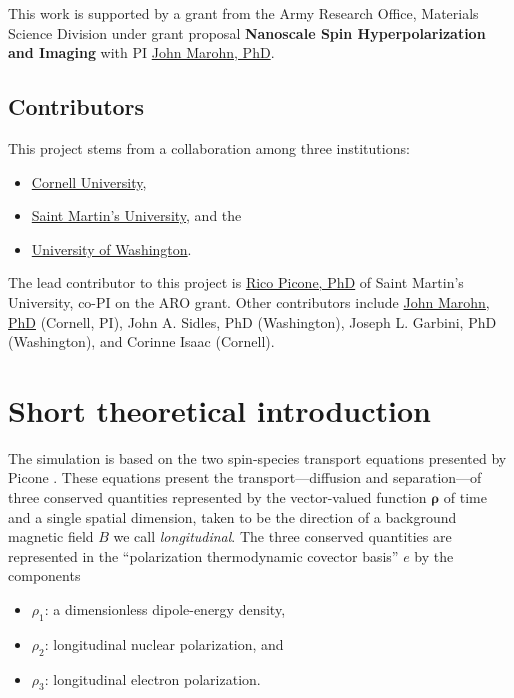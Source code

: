 \documentclass[%
oneside,                 %
final,                   %
10pt]{article}
\begin{document}
This work is supported by a grant from the Army Research Office, Materials Science Division under grant proposal \textbf{Nanoscale Spin Hyperpolarization and Imaging}
with PI \href{{http://marohn.chem.cornell.edu/}}{John Marohn, PhD}.

\subsection{Contributors}

This project stems from a collaboration among three institutions:

\begin{itemize}
\item \href{{http://www.cornell.edu/}}{Cornell University},

\item \href{{https://www.stmartin.edu/}}{Saint Martin's University}, and the

\item \href{{http://www.washington.edu/}}{University of Washington}.
\end{itemize}

\noindent
The lead contributor to this project is \href{{http://ricopic.one}}{Rico Picone, PhD} of Saint Martin's University, co-PI on the ARO grant.
Other contributors include \href{{http://marohn.chem.cornell.edu/}}{John Marohn, PhD} (Cornell, PI), John A. Sidles, PhD (Washington), Joseph L. Garbini, PhD (Washington), and Corinne Isaac (Cornell).

\section{Short theoretical introduction}
\label{section:shorttheory}

The simulation is based on the two spin-species transport equations presented by Picone \cite{Picone2014b}.
These equations present the transport---diffusion and separation---of three conserved quantities represented by the vector-valued function $\bm{\rho}$ of time and a single spatial dimension, taken to be the direction of a background magnetic field $B$ we call \emph{longitudinal}.
The three conserved quantities are represented in the ``polarization thermodynamic covector basis'' $e$ by the components \cite{Picone2014b}

\begin{itemize}
\item $\rho_1$: a dimensionless dipole-energy density,

\item $\rho_2$: longitudinal nuclear polarization, and

\item $\rho_3$: longitudinal electron polarization.
\end{itemize}
\end{document}
